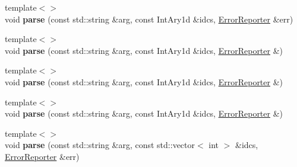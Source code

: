 \begin{DoxyCompactItemize}
\item 
\mbox{\label{structdf_1_1program__options__lite_1_1_option_a0f8ebb90e4df65d8f78c0003f29c09c5}} 
{\footnotesize template$<$$>$ }\\void {\bfseries parse} (const std\+::string \&arg, const Int\+Ary1d \&idcs, \hyperlink{structdf_1_1program__options__lite_1_1_error_reporter}{Error\+Reporter} \&err)
\item 
\mbox{\label{structdf_1_1program__options__lite_1_1_option_a4c201c44f50900fcc389d8d11ec78bb9}} 
{\footnotesize template$<$$>$ }\\void {\bfseries parse} (const std\+::string \&arg, const Int\+Ary1d \&idcs, \hyperlink{structdf_1_1program__options__lite_1_1_error_reporter}{Error\+Reporter} \&)
\item 
\mbox{\label{structdf_1_1program__options__lite_1_1_option_a820c2c0324cd4fa10ec92f7c678b7219}} 
{\footnotesize template$<$$>$ }\\void {\bfseries parse} (const std\+::string \&arg, const Int\+Ary1d \&idcs, \hyperlink{structdf_1_1program__options__lite_1_1_error_reporter}{Error\+Reporter} \&)
\item 
\mbox{\label{structdf_1_1program__options__lite_1_1_option_a3c0cf3d3832a1f3dc50ecafff2fa0deb}} 
{\footnotesize template$<$$>$ }\\void {\bfseries parse} (const std\+::string \&arg, const Int\+Ary1d \&idcs, \hyperlink{structdf_1_1program__options__lite_1_1_error_reporter}{Error\+Reporter} \&)
\item 
\mbox{\label{structdf_1_1program__options__lite_1_1_option_ac4207cd6d487a958c2acf687ad2c9a1a}} 
{\footnotesize template$<$$>$ }\\void {\bfseries parse} (const std\+::string \&arg, const std\+::vector$<$ int $>$ \&idcs, \hyperlink{structdf_1_1program__options__lite_1_1_error_reporter}{Error\+Reporter} \&err)
\item 
\mbox{\label{structdf_1_1program__options__lite_1_1_option_adba4874f091e49deeb4d6ffed5ae0349}} 

\end{DoxyCompactItemize}
